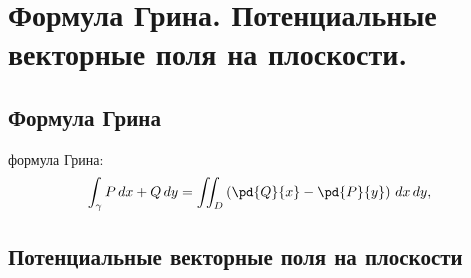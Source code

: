 \chapter{Формула Грина. Потенциальные векторные поля на плоскости.}
\section{Формула Грина} 



 формула Грина:
\begin{equation}
\int_\gamma P\, dx + Q\, dy = \iint_D \left(\pd{Q}{x}-\pd{P}{y}\right)\,dx\,dy ,
\end{equation}



\section{Потенциальные векторные поля на плоскости}